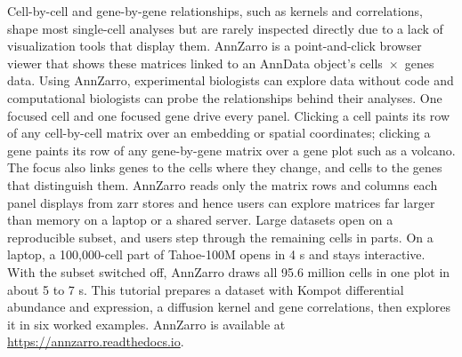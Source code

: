 Cell-by-cell and gene-by-gene relationships, such as kernels and correlations, shape most single-cell analyses but are rarely inspected directly due to a lack of visualization tools that display them. AnnZarro is a point-and-click browser viewer that shows these matrices linked to an AnnData object's cells~$\times$~genes data. Using AnnZarro, experimental biologists can explore data without code and computational biologists can probe the relationships behind their analyses. One focused cell and one focused gene drive every panel. Clicking a cell paints its row of any cell-by-cell matrix over an embedding or spatial coordinates; clicking a gene paints its row of any gene-by-gene matrix over a gene plot such as a volcano. The focus also links genes to the cells where they change, and cells to the genes that distinguish them. AnnZarro reads only the matrix rows and columns each panel displays from zarr stores and hence users can explore matrices far larger than memory on a laptop or a shared server. Large datasets open on a reproducible subset, and users step through the remaining cells in parts. On a laptop, a 100,000-cell part of Tahoe-100M opens in 4 s and stays interactive. With the subset switched off, AnnZarro draws all 95.6 million cells in one plot in about 5 to 7 s. %
This tutorial prepares a dataset with Kompot differential abundance and expression, a diffusion kernel and gene correlations, then explores it in six worked examples. AnnZarro is available at \url{https://annzarro.readthedocs.io}.
